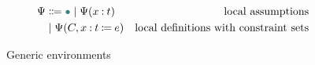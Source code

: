 \begin{figure}
\centering
\begin{align*}
\Psi &\Coloneqq \mt \mid \Psi(\assm{x}{t}) &\text{local assumptions} \\
    &\mid \Psi(C, \defn{x}{t}{e}) &\text{local definitions with constraint sets}
\end{align*}
\caption{Generic environments}
\label{fig:contexts-gen}
\end{figure}

